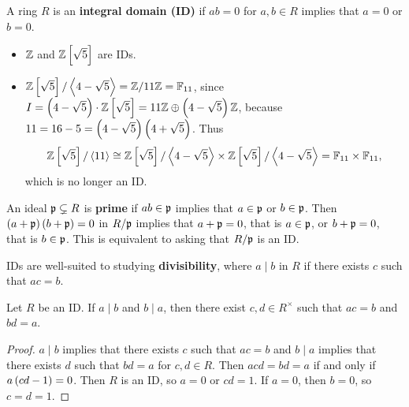 \begin{definition}
A ring $ R $ is an \textbf{integral domain (ID)} if $ ab = 0 $ for $ a, b \in R $ implies that $ a = 0 $ or $ b = 0 $.
\end{definition}

\begin{example*}
\hfill
\begin{itemize}
\item $ \mathbb{Z} $ and $ \ZZ\sbr{\sqrt{5}} $ are IDs.
\item $ \ZZ\sbr{\sqrt{5}} / \abr{4 - \sqrt{5}} = \ZZ / 11\ZZ = \FF_{11} $, since $ I = \br{4 - \sqrt{5}} \cdot \ZZ\sbr{\sqrt{5}} = 11\ZZ \oplus \br{4 - \sqrt{5}}\ZZ $, because $ 11 = 16 - 5 = \br{4 - \sqrt{5}}\br{4 + \sqrt{5}} $. Thus
$$ \ZZ\sbr{\sqrt{5}} / \abr{11} \cong \ZZ\sbr{\sqrt{5}} / \abr{4 - \sqrt{5}} \times \ZZ\sbr{\sqrt{5}} / \abr{4 - \sqrt{5}} = \FF_{11} \times \FF_{11}, $$
which is no longer an ID.
\end{itemize}
\end{example*}

\begin{remark*}
An ideal $ \mathfrak{p} \subsetneq R $ is \textbf{prime} if $ ab \in \mathfrak{p} $ implies that $ a \in \mathfrak{p} $ or $ b \in \mathfrak{p} $. Then $ \br{a + \ppp}\br{b + \ppp} = 0 $ in $ R / \mathfrak{p} $ implies that $ a + \mathfrak{p} = 0 $, that is $ a \in \mathfrak{p} $, or $ b + \mathfrak{p} = 0 $, that is $ b \in \mathfrak{p} $. This is equivalent to asking that $ R / \mathfrak{p} $ is an ID.
\end{remark*}

IDs are well-suited to studying \textbf{divisibility}, where $ a \mid b $ in $ R $ if there exists $ c $ such that $ ac = b $.

\begin{lemma}
Let $ R $ be an ID. If $ a \mid b $ and $ b \mid a $, then there exist $ c, d \in R^\times $ such that $ ac = b $ and $ bd = a $.
\end{lemma}

\begin{proof}
$ a \mid b $ implies that there exists $ c $ such that $ ac = b $ and $ b \mid a $ implies that there exists $ d $ such that $ bd = a $ for $ c, d \in R $. Then $ acd = bd = a $ if and only if $ a\br{cd - 1} = 0 $. Then $ R $ is an ID, so $ a = 0 $ or $ cd = 1 $. If $ a = 0 $, then $ b = 0 $, so $ c = d = 1 $.
\end{proof}

\pagebreak

